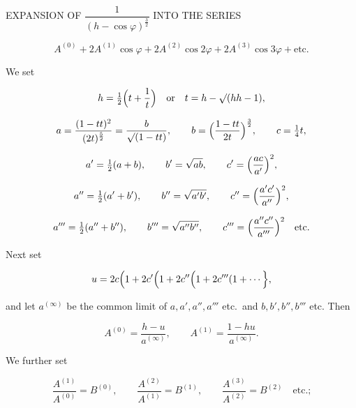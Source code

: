 \clearpage
{}%

\begin{center}
\large EXPANSION OF $\dfrac{1}{(h-\cos\varphi)^{\frac{3}{2}}}$ INTO THE SERIES
\end{center}

\[
A^{(0)}+2A^{(1)}\cos\varphi+2A^{(2)}\cos2\varphi+2A^{(3)}\cos3\varphi+\text{etc.}
\]

We set

\[
h=\tfrac{1}{2}\Bigl(t+\frac{1}{t}\Bigr)\quad\text{or}\quad t=h-\mathord{\surd}(hh-1),
\]

\[
a=\frac{(1-tt)^2}{(2t)^{\frac{5}{2}}}=\frac{b}{\mathord{\surd}(1-tt)},\qquad
b=\Bigl(\frac{1-tt}{2t}\Bigr)^{\frac{3}{2}},\qquad
c=\tfrac{1}{4}t,
\]

\[
a'=\tfrac{1}{2}(a+b),\qquad b'=\sqrt{ab},\qquad c'=\Bigl(\frac{ac}{a'}\Bigr)^{2},
\]

\[
a''=\tfrac{1}{2}(a'+b'),\qquad b''=\sqrt{a'b'},\qquad c''=\Bigl(\frac{a'c'}{a''}\Bigr)^{2},
\]

\[
a'''=\tfrac{1}{2}(a''+b''),\qquad b'''=\sqrt{a''b''},\qquad c'''=\Bigl(\frac{a''c''}{a'''}\Bigr)^{2}\quad\text{etc.}
\]

Next set

\[
u=2c\Bigl(1+2c'\Bigl(1+2c''\Bigl(1+2c'''(1+\cdots\Bigr\},
\]

\noindent and let $a^{(\infty)}$ be the common limit of $a,a',a'',a'''$ etc.\ and
$b,b',b'',b'''$ etc. Then

\[
A^{(0)}=\frac{h-u}{a^{(\infty)}},\qquad A^{(1)}=\frac{1-hu}{a^{(\infty)}}.
\]

We further set

\[
\frac{A^{(1)}}{A^{(0)}}=B^{(0)},\qquad
\frac{A^{(2)}}{A^{(1)}}=B^{(1)},\qquad
\frac{A^{(3)}}{A^{(2)}}=B^{(2)}\quad\text{etc.;}
\]
